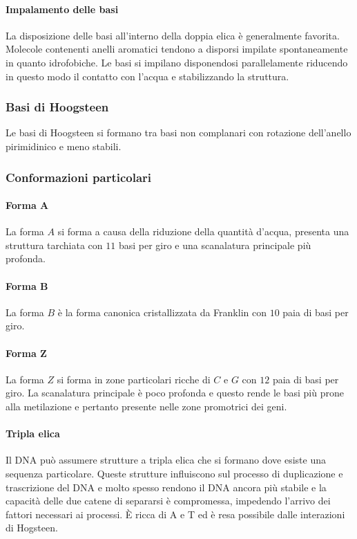 			\paragraph{Impalamento delle basi}
			La disposizione delle basi all'interno della doppia elica \`e generalmente favorita.
			Molecole contenenti anelli aromatici tendono a disporsi impilate spontaneamente in quanto idrofobiche.
			Le basi si impilano disponendosi parallelamente riducendo in questo modo il contatto con l'acqua e stabilizzando la struttura.

		\subsubsection{Basi di Hoogsteen}
		Le basi di Hoogsteen si formano tra basi non complanari con rotazione dell'anello pirimidinico e meno stabili.

		\subsubsection{Conformazioni particolari}
			
			\paragraph{Forma $\mathbf{A}$}
			La forma $A$ si forma a causa della riduzione della quantit\`a d'acqua, presenta una struttura tarchiata con $11$ basi per giro e una scanalatura principale pi\`u profonda.

			\paragraph{Forma $\mathbf{B}$}
			La forma $B$ \`e la forma canonica cristallizzata da Franklin con $10$ paia di basi per giro.

			\paragraph{Forma $\mathbf{Z}$}
			La forma $Z$ si forma in zone particolari ricche di $C$ e $G$ con $12$ paia di basi per giro.
			La scanalatura principale \`e poco profonda e questo rende le basi pi\`u prone alla metilazione e pertanto presente nelle zone promotrici dei geni.

			\paragraph{Tripla elica}
			Il DNA pu\`o assumere strutture a tripla elica che si formano dove esiste una sequenza particolare. 
			Queste strutture influiscono sul processo di duplicazione e trascrizione del DNA e molto spesso rendono il DNA ancora pi\`u stabile e la capacit\`a delle due catene di separarsi \`e compromessa, impedendo l'arrivo dei fattori necessari ai processi. 
			\`E ricca di A e T ed \`e resa possibile dalle interazioni di Hogsteen. 

